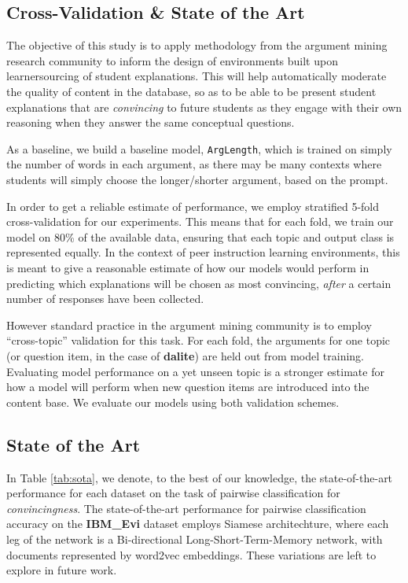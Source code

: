 \documentclass[runningheads]{llncs}
\begin{document}
\subsection{Cross-Validation \& State of the Art}

The objective of this study is to apply methodology from the argument mining 
research community to inform the design of environments built upon 
learnersourcing of student explanations. 
This will help automatically moderate the quality of content in the database, 
so as to be able to be present student explanations that are 
\textit{convincing} to future students as they engage with their own reasoning 
when they answer the same conceptual questions.

As a baseline, we build a baseline model, \verb|ArgLength|, which is trained 
on simply the number of words in each argument, as there may be many contexts 
where students will simply choose the longer/shorter argument, based on the 
prompt. 

In order to get a reliable estimate of performance, we employ stratified 5-fold 
cross-validation for our experiments.
This means that for each fold, we train our model on 80\% of the available 
data, ensuring that each topic and output class is represented equally. 
In the context of peer instruction learning environments, this is meant to give 
a reasonable estimate of how our models would perform in predicting which 
explanations will be chosen as most convincing, \textit{after} a certain number 
of responses have been collected.
 
However standard practice in the argument mining community is to employ 
``cross-topic'' validation for this task. 
For each fold, the arguments for one topic (or question item, in the case of 
\textbf{dalite}) are held out from model training.
Evaluating model performance on a yet unseen topic is a stronger estimate for 
how a model will perform when new question items are introduced into the 
content base.
We evaluate our models using both validation schemes.

\subsection{State of the Art}
In Table \ref{tab:sota}, we denote, to the best of our knowledge, the 
state-of-the-art performance for each dataset on the task of pairwise 
classification for \textit{convincingness}. 
The state-of-the-art performance for pairwise classification accuracy on the 
\textbf{IBM\_Evi} dataset employs Siamese architechture\cite{gleize_are_2019}, 
where each leg of the network  is a Bi-directional Long-Short-Term-Memory 
network, with documents represented by word2vec embeddings. These variations 
are left to explore in future work.
\end{document}
